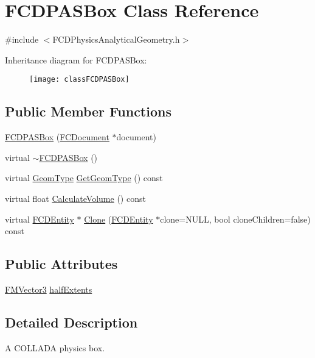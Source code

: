 \hypertarget{classFCDPASBox}{
\section{FCDPASBox Class Reference}
\label{classFCDPASBox}
}


{\ttfamily \#include $<$FCDPhysicsAnalyticalGeometry.h$>$}

Inheritance diagram for FCDPASBox:\begin{figure}[H]
\begin{center}
\leavevmode
\texttt{[image: classFCDPASBox]}
\end{center}
\end{figure}
\subsection*{Public Member Functions}
\begin{DoxyCompactItemize}
\item 
\hyperlink{classFCDPASBox_a7bfc08418717115ab302677f5f87821f}{FCDPASBox} (\hyperlink{classFCDocument}{FCDocument} $\ast$document)
\item 
virtual \hyperlink{classFCDPASBox_aae464f9822d5e7fe44df2874a11f2143}{$\sim$FCDPASBox} ()
\item 
virtual \hyperlink{classFCDPhysicsAnalyticalGeometry_a511583406e5c6a1bb5bd84c0453a452c}{GeomType} \hyperlink{classFCDPASBox_a4b2cdf28c8dffcc0b4a839f75900baeb}{GetGeomType} () const 
\item 
virtual float \hyperlink{classFCDPASBox_a2b4be02d7f8b4dd8d9dd591d4657b5a4}{CalculateVolume} () const 
\item 
virtual \hyperlink{classFCDEntity}{FCDEntity} $\ast$ \hyperlink{classFCDPASBox_a75222259173d8dd1e54e49f08f9ea262}{Clone} (\hyperlink{classFCDEntity}{FCDEntity} $\ast$clone=NULL, bool cloneChildren=false) const 
\end{DoxyCompactItemize}
\subsection*{Public Attributes}
\begin{DoxyCompactItemize}
\item 
\hyperlink{classFMVector3}{FMVector3} \hyperlink{classFCDPASBox_a1550f8088304f350f1dd3c92b123e82b}{halfExtents}
\end{DoxyCompactItemize}


\subsection{Detailed Description}
A COLLADA physics box. 

